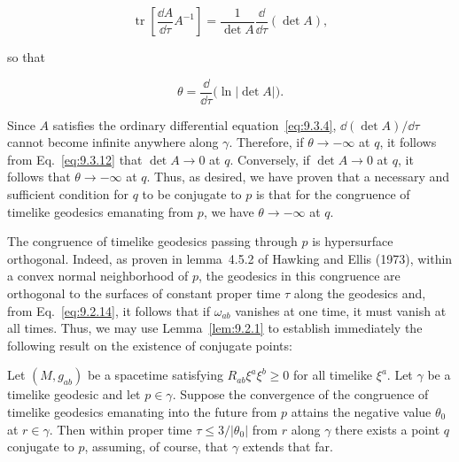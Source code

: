 \begin{equation}
  \operatorname{tr}\left[\frac{\dd A}{\dd\tau}A^{-1}\right]
  =\frac1{\det A}\frac{\dd}{\dd\tau}(\det A) ,
  \tag{9.3.11}\label{eq:9.3.11}
\end{equation}

so that

\begin{equation}
  \theta=\frac{\dd}{\dd\tau}\bigl(\ln\lvert\det A\rvert\bigr) .
  \tag{9.3.12}\label{eq:9.3.12}
\end{equation}

Since \(A\) satisfies the ordinary differential equation~\eqref{eq:9.3.4},
\(\dd(\det A)/\dd\tau\) cannot become infinite anywhere along \(\gamma\). Therefore,
if \(\theta\to-\infty\) at \(q\), it follows from Eq.~\eqref{eq:9.3.12} that
\(\det A\to0\) at \(q\). Conversely, if \(\det A\to0\) at \(q\), it follows that
\(\theta\to-\infty\) at \(q\). Thus, as desired, we have proven that a necessary and
sufficient condition for \(q\) to be conjugate to \(p\) is that for the congruence of
timelike geodesics emanating from \(p\), we have \(\theta\to-\infty\) at \(q\).

The congruence of timelike geodesics passing through \(p\) is hypersurface
orthogonal. Indeed, as proven in lemma~4.5.2 of Hawking and Ellis (1973), within a
convex normal neighborhood of \(p\), the geodesics in this congruence are orthogonal
to the surfaces of constant proper time \(\tau\) along the geodesics and, from
Eq.~\eqref{eq:9.2.14}, it follows that if \(\omega_{ab}\) vanishes at one time, it must
vanish at all times. Thus, we may use Lemma~\ref{lem:9.2.1} to establish immediately
the following result on the existence of conjugate points:

\begin{proposition}\label{prop:9.3.1}
Let \((M,g_{ab})\) be a spacetime satisfying \(R_{ab}\xi^a\xi^b\geq0\) for all
timelike \(\xi^a\). Let \(\gamma\) be a timelike geodesic and let \(p\in\gamma\).
Suppose the convergence of the congruence of timelike geodesics emanating into
the future from \(p\) attains the negative value \(\theta_0\) at \(r\in\gamma\).
Then within proper time \(\tau\leq3/\lvert\theta_0\rvert\) from \(r\) along
\(\gamma\) there exists a point \(q\) conjugate to \(p\), assuming, of course,
that \(\gamma\) extends that far.
\end{proposition}

